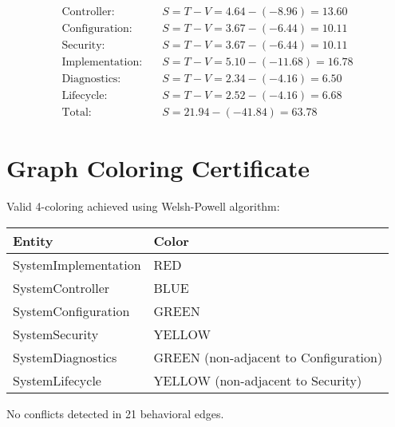 \documentclass[12pt,a4paper]{article}
\begin{document}
\begin{align*}
\text{Controller:} \quad & S = T - V = 4.64 - (-8.96) = 13.60 \\
\text{Configuration:} \quad & S = T - V = 3.67 - (-6.44) = 10.11 \\
\text{Security:} \quad & S = T - V = 3.67 - (-6.44) = 10.11 \\
\text{Implementation:} \quad & S = T - V = 5.10 - (-11.68) = 16.78 \\
\text{Diagnostics:} \quad & S = T - V = 2.34 - (-4.16) = 6.50 \\
\text{Lifecycle:} \quad & S = T - V = 2.52 - (-4.16) = 6.68 \\
\hline
\text{Total:} \quad & S = 21.94 - (-41.84) = 63.78
\end{align*}

\section{Graph Coloring Certificate}

Valid 4-coloring achieved using Welsh-Powell algorithm:

\begin{center}
\begin{tabular}{ll}
\toprule
\textbf{Entity} & \textbf{Color} \\
\midrule
SystemImplementation & RED \\
SystemController & BLUE \\
SystemConfiguration & GREEN \\
SystemSecurity & YELLOW \\
SystemDiagnostics & GREEN (non-adjacent to Configuration) \\
SystemLifecycle & YELLOW (non-adjacent to Security) \\
\bottomrule
\end{tabular}
\end{center}

No conflicts detected in 21 behavioral edges.
\end{document}
